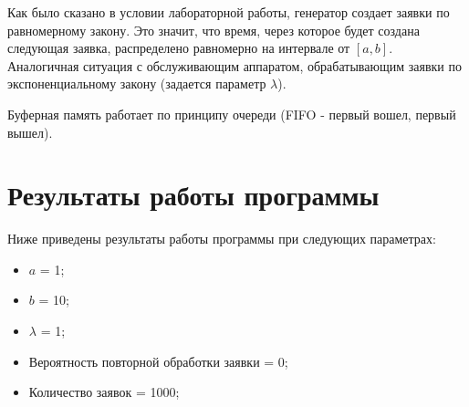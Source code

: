 \documentclass[a4paper,12pt]{article}
\begin{document}
	Как было сказано в условии лабораторной работы, генератор создает заявки по равномерному закону. Это значит, что время, через которое будет создана следующая заявка, распределено равномерно на интервале от $[a, b]$. Аналогичная ситуация с обслуживающим аппаратом, обрабатывающим заявки по экспоненциальному закону (задается параметр $\lambda$).
	
	Буферная память работает по принципу очереди (FIFO - первый вошел, первый вышел).
	
	\section*{Результаты работы программы}
	
	Ниже приведены результаты работы программы при следующих параметрах:
	
	\begin{itemize}
		\item $a$ = 1;
		\item $b$ = 10;
		\item $\lambda$ = 1;
		\item Вероятность повторной обработки заявки = 0;
		\item Количество заявок = 1000;
	\end{itemize}

	\newpage
\end{document}
